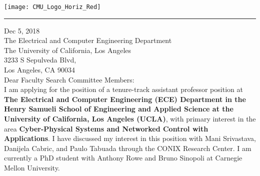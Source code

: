 \documentclass[10pt]{article}
\date{}
\begin{document}
\begin{minipage}[t!]{\textwidth}
\texttt{[image: CMU\_Logo\_Horiz\_Red]}\vspace{-10pt}\\
\noindent\rule{\textwidth}{0.5pt}
\end{minipage}


\vspace{10pt}



Dec 5, 2018\\

The Electrical and Computer Engineering Department\\
The University of California, Los Angeles\\
3233 S Sepulveda Blvd, \\
Los Angeles, CA 90034\\




Dear Faculty Search Committee Members:\\


I am applying for the position of a tenure-track assistant professor position at \textbf{The Electrical and Computer Engineering (ECE) Department in the Henry Samueli School of Engineering and Applied Science at the University of California, Los Angeles (UCLA)}, with primary interest in the area \textbf{Cyber-Physical Systems and Networked Control with Applications}. I have discussed my interest in this position with Mani Srivastava, Danijela Cabric, and Paulo Tabuada through the CONIX Research Center. %
I am currently a PhD student with Anthony Rowe and Bruno Sinopoli at Carnegie Mellon University.\\ %
\end{document}
